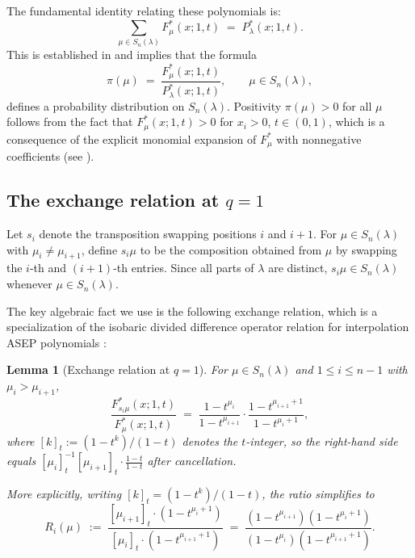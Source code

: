 \documentclass[12pt]{article}
\newtheorem{lemma}[theorem]{Lemma}
\begin{document}
The fundamental identity relating these polynomials is:
\begin{equation}\label{eq:sum}
\sum_{\mu \in S_n(\lambda)} F^*_\mu(x;1,t) \;=\; P^*_\lambda(x;1,t).
\end{equation}
This is established in \cite{CMW} and implies that the formula
\begin{equation}\label{eq:pi}
\pi(\mu) \;=\; \frac{F^*_\mu(x;1,t)}{P^*_\lambda(x;1,t)}, \qquad \mu \in S_n(\lambda),
\end{equation}
defines a probability distribution on $S_n(\lambda)$. Positivity $\pi(\mu) > 0$ for all $\mu$ follows from the fact that $F^*_\mu(x;1,t) > 0$ for $x_i > 0$, $t \in (0,1)$, which is a consequence of the explicit monomial expansion of $F^*_\mu$ with nonneg\-ative coefficients (see \cite{CMW}).

\subsection{The exchange relation at $q=1$}

Let $s_i$ denote the transposition swapping positions $i$ and $i+1$. For $\mu \in S_n(\lambda)$ with $\mu_i \neq \mu_{i+1}$, define $s_i\mu$ to be the composition obtained from $\mu$ by swapping the $i$-th and $(i+1)$-th entries. Since all parts of $\lambda$ are distinct, $s_i\mu \in S_n(\lambda)$ whenever $\mu \in S_n(\lambda)$.

The key algebraic fact we use is the following exchange relation, which is a specialization of the isobaric divided difference operator relation for interpolation ASEP polynomials \cite{CMW,denier}:

\begin{lemma}[Exchange relation at $q=1$]\label{lem:exchange}
For $\mu \in S_n(\lambda)$ and $1 \leq i \leq n-1$ with $\mu_i > \mu_{i+1}$,
\begin{equation}\label{eq:exchange}
\frac{F^*_{s_i\mu}(x;1,t)}{F^*_\mu(x;1,t)} \;=\; \frac{1 - t^{\mu_i}}{1 - t^{\mu_{i+1}}} \cdot \frac{1 - t^{\mu_{i+1}+1}}{1 - t^{\mu_i + 1}},
\end{equation}
where $[k]_t := (1 - t^k)/(1-t)$ denotes the $t$-integer, so the right-hand side equals $[{\mu_i}]_t^{-1}[\mu_{i+1}]_t \cdot \frac{1-t}{1-t}$ after cancellation.

More explicitly, writing $[k]_t = (1-t^k)/(1-t)$, the ratio simplifies to
\begin{equation}\label{eq:ratio}
R_i(\mu) \;:=\; \frac{[\mu_{i+1}]_t \cdot (1-t^{\mu_i+1})}{[\mu_i]_t \cdot (1-t^{\mu_{i+1}+1})} \;=\; \frac{(1-t^{\mu_{i+1}})(1-t^{\mu_i+1})}{(1-t^{\mu_i})(1-t^{\mu_{i+1}+1})}.
\end{equation}
\end{lemma}
\end{document}
